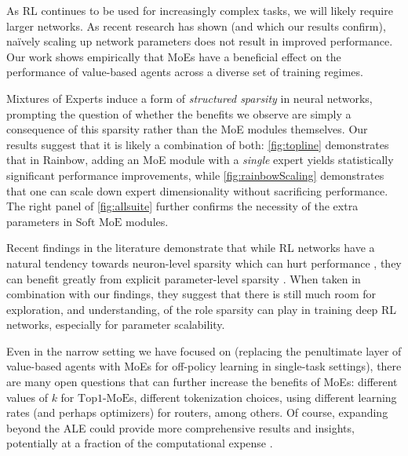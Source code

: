 \documentclass{article}
\theoremstyle{plain}
\theoremstyle{definition}
\theoremstyle{remark}
\newcommand{\moe}{$\textrm{Top1-MoE}$}
\newcommand{\softmoe}{$\textrm{Soft MoE}$}
\begin{document}
As RL continues to be used for increasingly complex tasks, we will likely require larger networks. As recent research has shown (and which our results confirm), na\"{i}vely scaling up network parameters does not result in improved performance. Our work shows empirically that MoEs have a beneficial effect on the performance of value-based agents across a diverse set of training regimes.

Mixtures of Experts induce a form of {\em structured sparsity} in neural networks, prompting the question of whether the benefits we observe are simply a consequence of this sparsity rather than the MoE modules themselves. Our results suggest that it is likely a combination of both: \cref{fig:topline} demonstrates that in Rainbow, adding an MoE module with a {\em single} expert yields statistically significant performance improvements, while \cref{fig:rainbowScaling} demonstrates that one can scale down expert dimensionality without sacrificing performance. The right panel of \cref{fig:allsuite} further confirms the necessity of the extra parameters in \softmoe{} modules.

Recent findings in the literature demonstrate that while RL networks have a natural tendency towards neuron-level sparsity which can hurt performance \citep{sokar2023dormant}, they can benefit greatly from explicit parameter-level sparsity \citep{graesser2022state}. When taken in combination with our findings, they suggest that there is still much room for exploration, and understanding, of the role sparsity can play in training deep RL networks, especially for parameter scalability.

Even in the narrow setting we have focused on (replacing the penultimate layer of value-based agents with MoEs for off-policy learning in single-task settings), there are many open questions that can further increase the benefits of MoEs: different values of $k$ for \moe{}s, different tokenization choices, using different learning rates (and perhaps optimizers) for routers, among others. Of course, expanding beyond the ALE could provide more comprehensive results and insights, potentially at a fraction of the computational expense \citep{ceron2021revisiting}.
\end{document}
